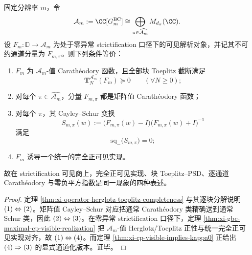 \begin{theorem}\label{thm:conclusion-operator-caratheodory-cp-visible-equivalence}
固定分辨率 \(m\)，令
\[
\mathcal A_m:=\CC[G_m^{\mathrm{BC}}]
\cong
\bigoplus_{\pi\in\widehat{\mathcal A_m}}M_{d_\pi}(\CC).
\]
设 \(F_m:\mathbb D\to\mathcal A_m\) 为处于零异常 strictification 口径下的可见解析对象，并记其不可约通道分量为 \(F_{m,\pi}\)。则下列条件等价：
\begin{enumerate}
  \item \(F_m\) 为 \(\mathcal A_m\)-值 Carath\'eodory 函数，且全部块 Toeplitz 截断满足
  \[
  \mathbf T_N^{\mathcal A_m}(F_m)\succeq 0
  \qquad(\forall N\ge 0);
  \]
  \item 对每个 \(\pi\in\widehat{\mathcal A_m}\)，分量 \(F_{m,\pi}\) 都是矩阵值 Carath\'eodory 函数；
  \item 对每个 \(\pi\)，其 Cayley--Schur 变换
  \[
  S_{m,\pi}(w):=\bigl(F_{m,\pi}(w)-I\bigr)\bigl(F_{m,\pi}(w)+I\bigr)^{-1}
  \]
  满足
  \[
  \mathrm{sq}_-\!\bigl(S_{m,\pi}\bigr)=0;
  \]
  \item \(F_m\) 诱导一个统一的完全正可见实现。
\end{enumerate}
故在 strictification 可见商上，完全正可见实现、块 Toeplitz--PSD、逐通道 Carath\'eodory 与零负平方指数是同一现象的四种表述。
\end{theorem}
\begin{proof}
定理 \ref{thm:xi-operator-herglotz-toeplitz-completeness} 与其逐块分解说明 \(\textup{(1)}\Leftrightarrow\textup{(2)}\)。矩阵值 Cayley--Schur 对应把通常 Carath\'eodory 类精确送到通常 Schur 类，因此 \(\textup{(2)}\Leftrightarrow\textup{(3)}\)。在零异常 strictification 口径下，定理 \ref{thm:xi-gbc-maximal-cp-visible-realization} 把 \(\mathcal A_m\)-值 Herglotz/Toeplitz 正性与统一完全正可见实现对齐，故 \(\textup{(1)}\Leftrightarrow\textup{(4)}\)。而定理 \ref{thm:xi-cp-visible-implies-kappa0} 正给出 \(\textup{(4)}\Rightarrow\textup{(3)}\) 的显式通道化版本。证毕。
\end{proof}


